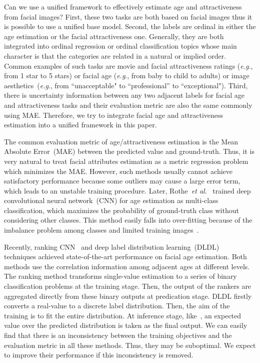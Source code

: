 \documentclass[5p,times,twocolumn]{elsarticle}
\makeatletter
\DeclareRobustCommand\onedot{\@onedot}
\def\@onedot{.}
\def\eg{\emph{e.g}\onedot}
\def\etal{\emph{et al}\onedot}
\makeatother
\begin{document}
{Can we use a unified framework to effectively estimate age and attractiveness from facial images? 
First, these two tasks are both based on facial images thus it is possible to use a unified base model. Second, the labels are ordinal in either the age estimation or the facial attractiveness one. Generally, they are both integrated into ordinal regression or ordinal classification topics whose main character is that the categories are related in a natural or implied order. Common examples of such tasks are movie and facial attractiveness ratings (\eg, from 1 star to 5 stars) or facial age (\eg, from baby to child to adults) or image aesthetics~(\eg, from ``unacceptable" to  ``professional'' to ``exceptional"). Third, there is uncertainty information between any two adjacent labels for facial age and attractiveness tasks and their evaluation metric are also the same commonly using MAE. Therefore, we try to integrate facial age and attractiveness estimation into a unified framework in this paper.}


The common evaluation metric of age/attractiveness estimation is the Mean Absolute Error~(MAE) between the predicted value and ground-truth. Thus, it is very natural to treat facial attributes estimation as a metric regression problem~\cite{ranjan2017all} which minimizes the MAE. However, such methods usually cannot achieve satisfactory performance because some outliers may cause a large error term, which leads to an unstable training procedure. Later, Rothe~\etal~\cite{rothe2016deep} trained deep convolutional neural network~(CNN) for age estimation as multi-class classification, which maximizes the probability of ground-truth class without considering other classes. This method easily falls into over-fitting because of the imbalance problem among classes and limited training images~\cite{gao2017deep}.

Recently, ranking CNN~\cite{niu2016ordinal,chen2017using,Chen2017Deep, li2017d2c} and deep label distribution learning~(DLDL)~\cite{gao2017deep,fan2017label} techniques achieved state-of-the-art performance on facial age estimation. Both methods use the correlation information among adjacent ages at different levels. The ranking method transforms single-value estimation to a series of binary classification problems at the training stage. Then, the output of the rankers are aggregated directly from these binary outputs at predication stage. DLDL firstly converts a real-value to a discrete label distribution. Then, the aim of the training is to fit the entire distribution. At inference stage, like~\cite{rothe2016deep}, an expected value over the predicted distribution is taken as the final output. We can easily find that there is an inconsistency between the training objectives and the evaluation metric in all these methods. Thus, they may be suboptimal. We expect to improve their performance if this inconsistency is removed.
\end{document}
